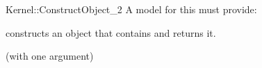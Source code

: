 \begin{ccRefFunctionObjectConcept}{Kernel::ConstructObject_2}
A model for this must provide:


{constructs an object that contains  and returns it.}

\ccRefines
{} (with one argument)

\ccSeeAlso
{} \\
 \\
 \\
 \\
 \\
  \\

\end{ccRefFunctionObjectConcept}
